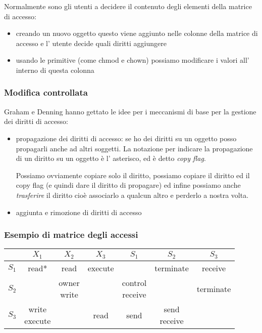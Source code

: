 Normalmente sono gli utenti a decidere il contenuto degli elementi della matrice di accesso:
\begin{itemize}
    \item creando un nuovo oggetto questo viene aggiunto nelle colonne della matrice di accesso e l' utente decide quali diritti aggiungere
    \item usando le primitive (come chmod e chown) possiamo modificare i valori all' interno di questa colonna
\end{itemize}

\subsubsection{Modifica controllata}
Graham e Denning hanno gettato le idee per i meccanismi di base per la gestione dei diritti di accesso:
\begin{itemize}
    \item propagazione dei diritti di accesso: se ho dei diritti su un oggetto posso propagarli anche ad altri soggetti.
    La notazione per indicare la propagazione di un diritto su un oggetto è l' asterisco, ed è detto \emph{copy flag}.

    Possiamo ovviamente copiare solo il diritto, possiamo copiare il diritto ed il copy flag (e quindi dare il diritto di propagare) ed infine possiamo anche \emph{trasferire} il diritto cioè associarlo a qualcun altro e perderlo a nostra volta.

    \item aggiunta e rimozione di diritti di accesso
\end{itemize}

\subsubsection{Esempio di matrice degli accessi}
\begin{table}[H]
    \centering
    \begin{tabular}{c|c|c|c|c|c|c}
        & $X_1$ & $X_2$ & $X_3$ & $S_1$ & $S_2$ & $S_3$ \\
        \hline
        $S_1$ & read* & read & execute & & terminate & receive \\ 
        $S_2$ & & \thead{owner \\ write} & & \thead{control \\ receive} & & terminate \\
        $S_3$ & \thead{write \\ execute} & & read & send & \thead{send \\ receive} & \\
    \end{tabular}
\end{table}

